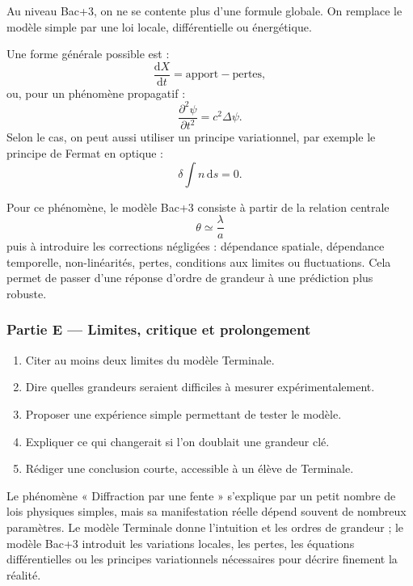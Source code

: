 \documentclass[11pt,a4paper]{article}
\begin{document}
\begin{approfondissementbox}
Au niveau Bac+3, on ne se contente plus d'une formule globale. On remplace le modèle simple par une loi locale, différentielle ou énergétique.

Une forme générale possible est :
\[
\frac{\mathrm d X}{\mathrm dt}=\text{apport}-\text{pertes},
\]
ou, pour un phénomène propagatif :
\[
\frac{\partial^2 \psi}{\partial t^2}=c^2\Delta\psi.
\]
Selon le cas, on peut aussi utiliser un principe variationnel, par exemple le principe de Fermat en optique :
\[
\delta \int n\,\mathrm ds=0.
\]

Pour ce phénomène, le modèle Bac+3 consiste à partir de la relation centrale
\[
\theta\simeq\frac{\lambda}{a}
\]
puis à introduire les corrections négligées : dépendance spatiale, dépendance temporelle, non-linéarités, pertes, conditions aux limites ou fluctuations. Cela permet de passer d'une réponse d'ordre de grandeur à une prédiction plus robuste.
\end{approfondissementbox}

\subsubsection*{Partie E — Limites, critique et prolongement}

\begin{enumerate}
  \item Citer au moins deux limites du modèle Terminale.
  \item Dire quelles grandeurs seraient difficiles à mesurer expérimentalement.
  \item Proposer une expérience simple permettant de tester le modèle.
  \item Expliquer ce qui changerait si l'on doublait une grandeur clé.
  \item Rédiger une conclusion courte, accessible à un élève de Terminale.
\end{enumerate}

\begin{corrigebox}
Le phénomène « Diffraction par une fente » s'explique par un petit nombre de lois physiques simples, mais sa manifestation réelle dépend souvent de nombreux paramètres. Le modèle Terminale donne l'intuition et les ordres de grandeur ; le modèle Bac+3 introduit les variations locales, les pertes, les équations différentielles ou les principes variationnels nécessaires pour décrire finement la réalité.
\end{corrigebox}
\end{document}
